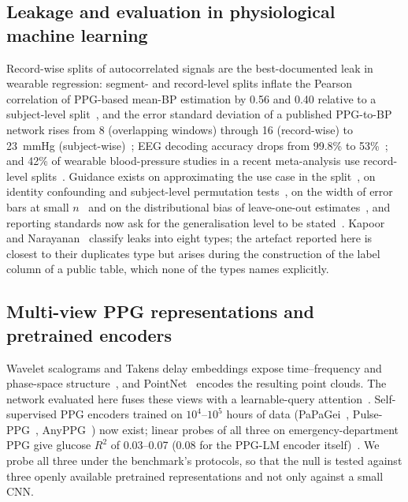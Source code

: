 \documentclass[journal]{IEEEtran}
\begin{document}
\subsection{Leakage and evaluation in physiological machine learning}
Record-wise splits of autocorrelated signals are the best-documented leak in
wearable regression: segment- and record-level splits inflate the Pearson
correlation of PPG-based mean-BP estimation by 0.56 and 0.40 relative to a
subject-level split~\cite{yoshizawa2023}, and the error standard deviation
of a published PPG-to-BP network rises from 8 (overlapping windows) through
16 (record-wise) to 23~mmHg (subject-wise)~\cite{mehta2024};
EEG decoding accuracy drops from 99.8\% to 53\%~\cite{brookshire2024}; and
42\% of wearable blood-pressure studies in a recent meta-analysis use
record-level splits~\cite{cheung2024}.  Guidance exists on approximating the
use case in the split~\cite{saeb2017}, on identity confounding and
subject-level permutation tests~\cite{chaibubneto2019}, on the width of
error bars at small $n$~\cite{varoquaux2018} and on the distributional bias
of leave-one-out estimates~\cite{austin2025}, and reporting standards now
ask for the generalisation level to be
stated~\cite{collins2024tripod,carlson2025nerve}.  Kapoor and
Narayanan~\cite{kapoor2023leakage} classify leaks into eight types; the
artefact reported here is closest to their duplicates type but arises during
the construction of the label column of a public table, which none of the
types names explicitly.

\subsection{Multi-view PPG representations and pretrained encoders}
Wavelet scalograms and Takens delay embeddings expose time--frequency and
phase-space structure~\cite{takens1981}, and PointNet~\cite{qi2017pointnet}
encodes the resulting point clouds.  The network evaluated here fuses these
views with a learnable-query attention~\cite{vaswani2017attention}.
Self-supervised PPG encoders trained on $10^4$--$10^5$ hours of data
(PaPaGei~\cite{papagei2025}, Pulse-PPG~\cite{pulseppg2025},
AnyPPG~\cite{anyppg2026}) now exist; linear probes of all three on
emergency-department PPG give glucose $R^2$ of 0.03--0.07 (0.08 for the
PPG-LM encoder itself)~\cite{ppglm2026}.  We probe all three under the
benchmark's protocols, so that the null is tested against three openly
available pretrained representations and not only against a small CNN.
\end{document}

